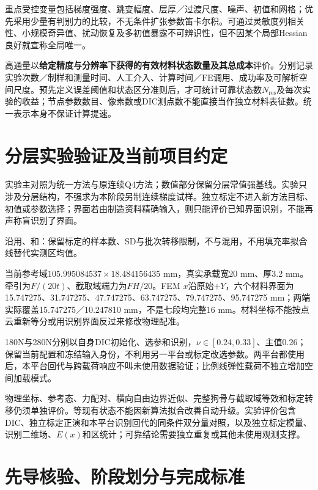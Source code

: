 \documentclass[11pt,a4paper]{ctexart}
\begin{document}
重点受控变量包括梯度强度、跳变幅度、层厚／过渡尺度、噪声、初值和网格；优先采用少量有判别力的比较，不无条件扩张参数笛卡尔积。可通过灵敏度列相关性、小规模奇异值、扰动恢复及多初值暴露不可辨识性，但不因某个局部Hessian良好就宣称全局唯一。

高通量以\textbf{给定精度与分辨率下获得的有效材料状态数量及其总成本}评价。分别记录实验次数／制样和测量时间、人工介入、计算时间／FE调用、成功率及可解析空间尺度。预先定义误差阈值和状态区分准则后，才可统计可靠状态数$N_{\mathrm{res}}$及每次实验的收益；节点参数数目、像素数或DIC测点数不能直接当作独立材料表征数。统一表示本身不保证计算提速。

\section{分层实验验证及当前项目约定}
实验主对照为统一方法与原连续Q4方法；数值部分保留分层常值强基线。实验只涉及分层结构，不强求为本阶段另制连续梯度试样。独立标定不进入新方法目标、初值或参数选择；界面若由制造资料精确输入，则只能评价已知界面识别，不能再声称盲识别了界面。

沿用、和：保留标定的样本数、SD与批次转移限制，不与混用，不用填充率拟合线替代实测区均值。

当前参考域$105.995084537\times18.484156435$ mm，真实承载宽20 mm、厚3.2 mm。牵引为$F/(20t)$、截取域端力为$FH/20$。FEM $x$沿原始$+Y$，六个材料界面为15.747275、31.747275、47.747275、63.747275、79.747275、95.747275 mm；两端实际覆盖15.747275／10.247810 mm，不是七段均完整16 mm。材料坐标不能按点云重新等分或用识别界面反过来修改物理配准。

180N与280N分别以自身DIC初始化、选参和识别，$\nu\in[0.24,0.33]$、主值0.26；保留当前配置和冻结输入身份，不利用另一平台或标定改选参数。两平台都使用后，本平台回代与跨载荷响应不叫未使用数据验证；比例线弹性载荷不独立增加空间加载模式。

物理坐标、参考态、力配对、横向自由边界近似、完整狗骨与截取域等效和标定转移仍须单独评价。等现有状态不能因新算法拟合改善自动升级。实验评价包含DIC、独立标定正演和本平台识别回代的同条件双分量对照，以及独立标定模量、识别二维场、$E(x)$和区统计；可靠结论需要独立重复或其他未使用观测支撑。

\section{先导核验、阶段划分与完成标准}
\end{document}
